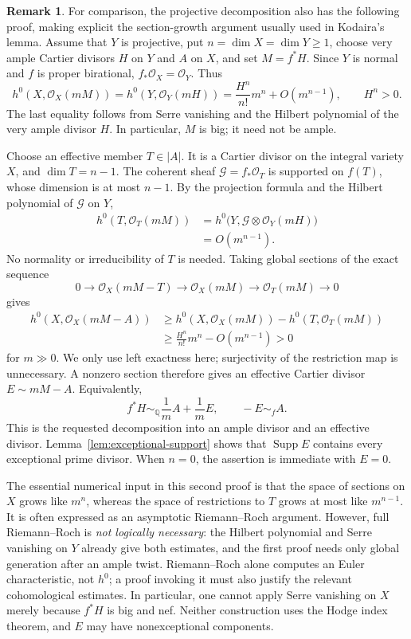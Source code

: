 \documentclass[12pt,a4paper,psamsfonts]{amsart}
\theoremstyle{plain}
\theoremstyle{definition}
\newtheorem{remark}[theorem]{Remark}
\newcommand{\Q}{\mathbb Q}
\newcommand{\OO}{\mathcal O}
\DeclareMathOperator{\Supp}{Supp}
\begin{document}
\begin{remark}
For comparison, the projective decomposition also has the following proof, making
explicit the section-growth argument usually used in Kodaira's
lemma. Assume that $Y$ is projective, put $n=\dim X=\dim Y\geq1$,
choose very ample Cartier divisors $H$ on $Y$ and $A$ on $X$,
and set $M=f^*H$. Since $Y$ is normal and $f$ is proper birational,
$f_*\OO_X=\OO_Y$. Thus
\[
h^0(X,\OO_X(mM))=h^0(Y,\OO_Y(mH))
=\frac{H^n}{n!}m^n+O(m^{n-1}),\qquad H^n>0.
\]
The last equality follows from Serre vanishing and the Hilbert
polynomial of the very ample divisor $H$. In particular, $M$ is
big; it need not be ample.

Choose an effective member $T\in|A|$. It is a Cartier divisor on
the integral variety $X$, and $\dim T=n-1$. The coherent sheaf
$\mathcal G=f_*\OO_T$ is supported on $f(T)$, whose dimension is at
most $n-1$. By the projection formula and the Hilbert polynomial
of $\mathcal G$ on $Y$,
\[
\begin{split}
h^0(T,\OO_T(mM))
&=h^0\bigl(Y,\mathcal G\otimes\OO_Y(mH)\bigr)\\
&=O(m^{n-1}).
\end{split}
\]
No normality or irreducibility of $T$ is needed. Taking global
sections of the exact sequence
\[
0\longrightarrow\OO_X(mM-T)\longrightarrow\OO_X(mM)
\longrightarrow\OO_T(mM)\longrightarrow0
\]
gives
\[
\begin{split}
h^0(X,\OO_X(mM-A))
&\geq h^0(X,\OO_X(mM))-h^0(T,\OO_T(mM))\\
&\geq \frac{H^n}{n!}m^n-O(m^{n-1})>0
\end{split}
\]
for $m\gg0$. We only use left exactness here; surjectivity of the
restriction map is unnecessary. A nonzero section therefore gives
an effective Cartier divisor $E\sim mM-A$. Equivalently,
\[
f^*H\sim_{\Q}\frac1m A+\frac1m E,
\qquad -E\sim_f A.
\]
This is the requested decomposition into an ample divisor and an
effective divisor. Lemma~\ref{lem:exceptional-support} shows that
$\Supp E$ contains every exceptional prime divisor. When $n=0$,
the assertion is immediate with $E=0$.

The essential numerical input in this second proof is that the
space of sections on $X$ grows like $m^n$, whereas the space of
restrictions to $T$ grows at most like $m^{n-1}$. It is often
expressed as an asymptotic Riemann--Roch argument. However, full
Riemann--Roch is \emph{not logically necessary}: the Hilbert
polynomial and Serre vanishing on $Y$ already give both estimates,
and the first proof needs only global generation after an ample
twist. Riemann--Roch alone computes an Euler characteristic, not
$h^0$; a proof invoking it must also justify the relevant
cohomological estimates. In particular, one cannot apply Serre
vanishing on $X$ merely because $f^*H$ is big and nef. Neither
construction uses the Hodge index theorem, and $E$ may have
nonexceptional components.
\end{remark}
\end{document}
